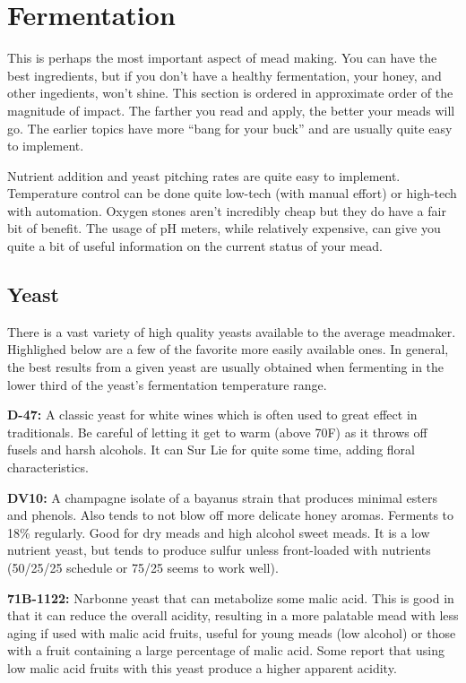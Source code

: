 \section{Fermentation}
 This is perhaps the most important aspect of mead making. You can have the best ingredients, but if you don't 
 have a healthy fermentation, your honey, and other ingedients, won't shine. This section is ordered in 
 approximate order of the magnitude of impact. The farther you read and apply, the better your meads will go. 
 The earlier topics have more ``bang for your buck'' and are  usually quite easy to implement. 

 Nutrient addition and yeast pitching rates are quite easy to implement. Temperature control can be done quite 
 low-tech (with manual effort) or high-tech with automation. Oxygen stones aren't incredibly cheap but they do 
 have a fair bit of benefit. The usage of pH meters, while relatively expensive, can give you quite a bit of 
 useful information on the current status of your mead.
 \subsection{Yeast}
  There is a vast variety of high quality yeasts available to the average meadmaker. Highlighed below are a few 
  of the favorite more easily available ones. In general, the best results from a given yeast are usually obtained 
  when fermenting in the lower third of the yeast's fermentation temperature range.

  \textbf{D-47:} A classic yeast for white wines which is often used to great effect in traditionals. 
   Be careful of letting it get to warm (above 70\textdegree F) as it throws off fusels and harsh alcohols. 
   It can Sur Lie for quite some time, adding floral characteristics.

  \textbf{DV10:} A champagne isolate of a bayanus strain that produces minimal esters and phenols. Also tends to 
   not blow off more delicate honey aromas. Ferments to 18\% regularly. Good for dry meads and high alcohol sweet 
   meads. It is a low nutrient yeast, but tends to produce sulfur unless front-loaded with nutrients 
   (50/25/25 schedule or 75/25 seems to work well).

  \textbf{71B-1122:} Narbonne yeast that can metabolize some malic acid. 
   This is good in that it can reduce the overall acidity, resulting in a more palatable mead with less aging if
   used with malic acid fruits, useful for young meads (low alcohol) or those with a fruit containing a large 
   percentage of malic acid. 
   Some report that using low malic acid fruits with this yeast produce a higher apparent acidity.


